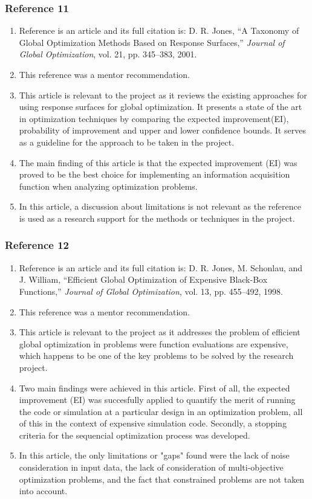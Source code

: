 \documentclass{journal}
\begin{document}
\subsubsection{Reference 11}
\begin{enumerate}
	\item Reference \cite{Jones2001} is an article and its full citation is: D. R. Jones, “A Taxonomy of Global Optimization Methods Based on Response Surfaces,” \textit{Journal of Global Optimization}, vol. 21, pp. 345–383, 2001.
	\item This reference was a mentor recommendation.
	\item This article is relevant to the project as it reviews the existing approaches for using response surfaces for global optimization. It presents a state of the art in optimization techniques by comparing the expected improvement(EI), probability of improvement and upper and lower confidence bounds. It serves as a guideline for the approach to be taken in the project.
	\item The main finding of this article is that the expected improvement (EI) was proved to be the best choice for implementing an information acquisition function when analyzing optimization problems.
	\item In this article, a discussion about limitations is not relevant as the reference is used as a research support for the methods or techniques in the project.
\end{enumerate}

\subsubsection{Reference 12}
\begin{enumerate}
	\item Reference \cite{Jones1998} is an article and its full citation is:  D. R. Jones, M. Schonlau, and J. William, “Efficient Global Optimization of Expensive Black-Box Functions,” \textit{Journal of Global Optimization}, vol. 13, pp. 455–492, 1998.
	\item This reference was a mentor recommendation.
	\item This article is relevant to the project as it addresses the problem of efficient global optimization in problems were function evaluations are expensive, which happens to be one of the key problems to be solved by the research project.
	\item Two main findings were achieved in this article. First of all, the expected improvement (EI) was succesfully applied to quantify the merit of running the code or simulation at a particular design in an optimization problem, all of this in the context of expensive simulation code. Secondly, a stopping criteria for the sequencial optimization process was developed.
	\item In this article, the only limitations or "gaps" found were the lack of noise consideration in input data, the lack of consideration of multi-objective optimization problems, and the fact that constrained problems are not taken into account.
\end{enumerate}
\end{document}
